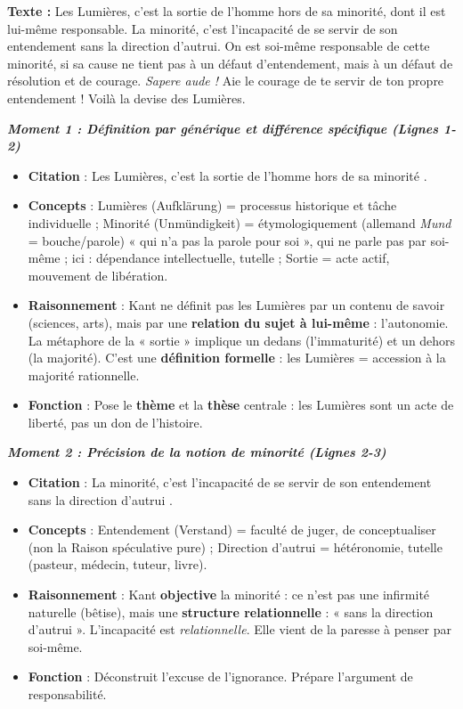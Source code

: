 \documentclass[11pt]{article}
\newcommand{\cle}[1]{{\popxbold\color{popdark}#1}}
\begin{document}
\begin{experience}
\textbf{Texte :} \guillemotleft Les Lumières, c'est la sortie de l'homme hors de sa minorité, dont il est lui-même responsable. La minorité, c'est l'incapacité de se servir de son entendement sans la direction d'autrui. On est soi-même responsable de cette minorité, si sa cause ne tient pas à un défaut d'entendement, mais à un défaut de résolution et de courage. \emph{Sapere aude !} Aie le courage de te servir de ton propre entendement ! Voilà la devise des Lumières. \guillemotright

\medskip
\emph{\textbf{Moment 1 : Définition par générique et différence spécifique (Lignes 1-2)}}
\begin{itemize}
    \item \textbf{Citation} : \guillemotleft Les Lumières, c'est la sortie de l'homme hors de sa minorité \guillemotright.
    \item \textbf{Concepts} : \cle{Lumières} (Aufklärung) = processus historique et tâche individuelle ; \cle{Minorité} (Unmündigkeit) = étymologiquement (allemand \emph{Mund} = bouche/parole) « qui n'a pas la parole pour soi », qui ne parle pas par soi-même ; ici : dépendance intellectuelle, tutelle ; \cle{Sortie} = acte actif, mouvement de libération.
    \item \textbf{Raisonnement} : Kant ne définit pas les Lumières par un contenu de savoir (sciences, arts), mais par une \textbf{relation du sujet à lui-même} : l'autonomie. La métaphore de la « sortie » implique un dedans (l'immaturité) et un dehors (la majorité). C'est une \textbf{définition formelle} : les Lumières = accession à la majorité rationnelle.
    \item \textbf{Fonction} : Pose le \textbf{thème} et la \textbf{thèse} centrale : les Lumières sont un acte de liberté, pas un don de l'histoire.
\end{itemize}

\emph{\textbf{Moment 2 : Précision de la notion de minorité (Lignes 2-3)}}
\begin{itemize}
    \item \textbf{Citation} : \guillemotleft La minorité, c'est l'incapacité de se servir de son entendement sans la direction d'autrui \guillemotright.
    \item \textbf{Concepts} : \cle{Entendement} (Verstand) = faculté de juger, de conceptualiser (non la Raison spéculative pure) ; \cle{Direction d'autrui} = hétéronomie, tutelle (pasteur, médecin, tuteur, livre).
    \item \textbf{Raisonnement} : Kant \textbf{objective} la minorité : ce n'est pas une infirmité naturelle (bêtise), mais une \textbf{structure relationnelle} : « sans la direction d'autrui ». L'incapacité est \emph{relationnelle}. Elle vient de la paresse à penser par soi-même.
    \item \textbf{Fonction} : Déconstruit l'excuse de l'ignorance. Prépare l'argument de responsabilité.
\end{itemize}


\end{experience}
\end{document}
